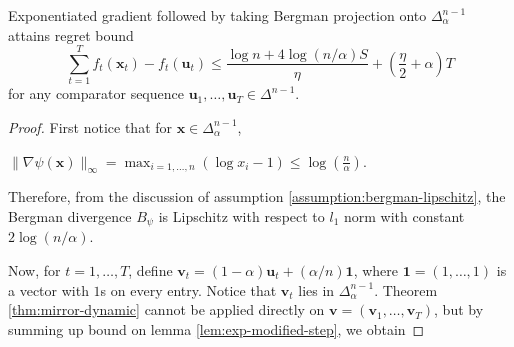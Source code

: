 \documentclass[12pt, a4paper]{report}
\begin{document}
\begin{prop} \label{prop:proj-eg-bound}
Exponentiated gradient followed by taking Bergman projection onto $\Delta_\alpha^{n-1}$ attains regret bound
\begin{equation*}
    \sum_{t=1}^T f_t(\mathbf{x}_t) - f_t(\mathbf{u}_t) \leq \frac{\log n + 4\log(n/\alpha) S}{\eta} + \left(\frac{\eta}{2} + \alpha\right)T
\end{equation*}
for any comparator sequence $\mathbf{u}_1, \dots, \mathbf{u}_T \in \Delta^{n-1}$.
\end{prop}
\begin{proof}
First notice that for $\mathbf{x} \in \Delta_\alpha^{n-1}$, 
\begin{center}
    $\displaystyle \lVert \nabla \psi(\mathbf{x}) \rVert_\infty = \max_{i=1, \dots, n} (\log x_i - 1) \leq \log\left(\frac{n}{\alpha}\right)$.
\end{center}
Therefore, from the discussion of assumption \ref{assumption:bergman-lipschitz}, the Bergman divergence $B_\psi$ is Lipschitz with respect to $l_1$ norm with constant $2\log(n/\alpha)$.

Now, for $t = 1, \dots, T$, define $\mathbf{v}_t = (1 - \alpha)\mathbf{u}_t + (\alpha/n) \mathbf{1}$, where $\mathbf{1} = (1, \dots, 1)$ is a vector with $1$s on every entry. Notice that $\mathbf{v}_t$ lies in $\Delta_\alpha^{n-1}$. Theorem \ref{thm:mirror-dynamic} cannot be applied directly on $\mathbf{v} = (\mathbf{v}_1, \dots, \mathbf{v}_T)$, but by summing up bound on lemma \ref{lem:exp-modified-step}, we obtain


\end{proof}
\end{document}

